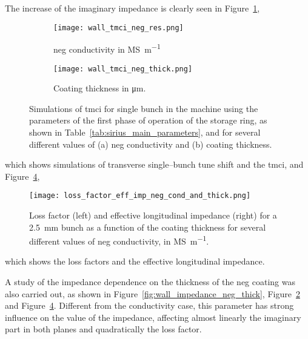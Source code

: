     The increase of the imaginary impedance is clearly seen in Figure~\ref{fig:wall_tmci_neg_res},
    \begin{figure}
        \centering
        \begin{subfigure}[c]{0.49\textwidth}
            \texttt{[image: wall\_tmci\_neg\_res.png]}
            \caption{\gls{neg} conductivity in \si{\mega\siemens\per\meter}}
            \label{fig:wall_tmci_neg_res}
            \end{subfigure}\hfill
            \begin{subfigure}[c]{0.49\textwidth}
                \texttt{[image: wall\_tmci\_neg\_thick.png]}
                \caption{Coating thickness in \si{\micro\meter}.}
                \label{fig:wall_tmci_neg_thick}
            \end{subfigure}
            \caption[Effect of NEG on TMCI.]{Simulations of \gls{tmci} for single bunch in the machine using the parameters of the first phase of operation of the storage ring, as shown in Table~\ref{tab:sirius_main_parameters}, and for several different values of (a) \gls{neg} conductivity and (b) coating thickness.}
            \label{fig:wall_tmci_neg}
        \end{figure}
    which shows simulations of transverse single--bunch tune shift and the \gls{tmci}, and Figure~\ref{fig:wall_loss_facttor_eff_imp_cond_thick},
    \begin{figure}
        \centering
        \texttt{[image: loss\_factor\_eff\_imp\_neg\_cond\_and\_thick.png]}
        \caption[Effect of NEG on loss factor and effective longitudinal impedance.]{Loss factor (left) and effective longitudinal impedance (right) for a \SI{2.5}{\milli\meter} bunch as a function of the coating thickness for several different values of \gls{neg} conductivity, in \si{\mega\siemens\per\meter}.}
        \label{fig:wall_loss_facttor_eff_imp_cond_thick}
    \end{figure}
    which shows the loss factors and the effective longitudinal impedance.

    A study of the impedance dependence on the thickness of the \gls{neg} coating was also carried out, as shown in Figure~\ref{fig:wall_impedance_neg_thick}, Figure~\ref{fig:wall_tmci_neg_thick} and Figure~\ref{fig:wall_loss_facttor_eff_imp_cond_thick}. Different from the conductivity case, this parameter has strong influence on the value of the impedance, affecting almost linearly the imaginary part in both planes and quadratically the loss factor.

